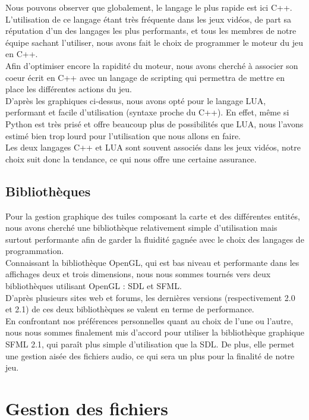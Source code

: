 \documentclass[a4paper]{article}
\newcommand{\alinea}{\hspace*{0.5cm}}
\begin{document}
        \alinea Nous pouvons observer que globalement, le langage le plus rapide est ici C++. L'utilisation de ce langage étant très fréquente dans les jeux vidéos, de part sa réputation d'un des langages les plus performants, et tous les membres de notre équipe sachant l'utiliser, nous avons fait le choix de programmer le moteur du jeu en C++.\\
        \alinea Afin d'optimiser encore la rapidité du moteur, nous avons cherché à associer son coeur écrit en C++ avec un langage de scripting qui permettra de mettre en place les différentes actions du jeu.\\ D'après les graphiques ci-dessus, nous avons opté pour le langage LUA, performant et facile d'utilisation (syntaxe proche du C++). En effet, même si Python est très prisé et offre beaucoup plus de possibilités que LUA, nous l'avons estimé bien trop lourd pour l'utilisation que nous allons en faire.\\
        \alinea Les deux langages C++ et LUA sont souvent associés dans les jeux vidéos, notre choix suit donc la tendance, ce qui nous offre une certaine assurance.

      \subsection{Bibliothèques}
        \alinea Pour la gestion graphique des tuiles composant la carte et des différentes entités, nous avons cherché une bibliothèque relativement simple d'utilisation mais surtout performante afin de garder la fluidité gagnée avec le choix des langages de programmation.\\
        \alinea Connaissant la bibliothèque OpenGL, qui est bas niveau et performante dans les affichages deux et trois dimensions, nous nous sommes tournés vers deux bibliothèques utilisant OpenGL : SDL et SFML.\\
        \alinea D'après plusieurs sites web et forums, les dernières versions (respectivement 2.0 et 2.1) de ces deux bibliothèques se valent en terme de performance.\\
        \alinea En confrontant nos préférences personnelles quant au choix de l'une ou l'autre, nous nous sommes finalement mis d'accord pour utiliser la bibliothèque graphique SFML 2.1, qui paraît plus simple d'utilisation que la SDL. De plus, elle permet une gestion aisée des fichiers audio, ce qui sera un plus pour la finalité de notre jeu.
      
    \section{Gestion des fichiers}
\end{document}
